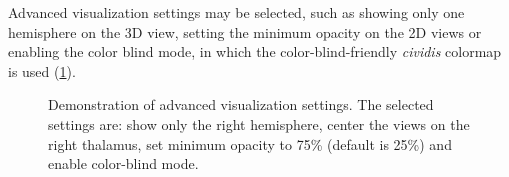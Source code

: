 Advanced visualization settings may be selected, such as
showing only one hemisphere on the 3D view,
setting the minimum opacity on the 2D views or
enabling the color blind mode, in which the color-blind-friendly \textit{cividis} colormap is used \cite{nunez_optimizing_2018} (\cref{fig:svt_advanced}).

\begin{figure}
  \centering
  \caption[Demonstration of advanced visualization settings]{
    Demonstration of advanced visualization settings.
    The selected settings are:
    show only the right hemisphere,
    center the views on the right thalamus,
    set minimum opacity to 75\% (default is 25\%)
    and enable color-blind mode.
  }
  \label{fig:svt_advanced}
\end{figure}
